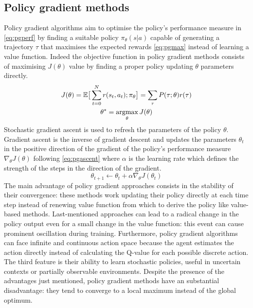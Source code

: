 \subsection{Policy gradient methods}

Policy gradient algorithms aim to optimise the policy's performance measure in \vref{eq:pgperf} by finding a suitable policy $\pi_\theta(s|a)$ capable of generating a trajectory $\tau$ that maximises the expected rewards \vref{eq:pgmax} instead of learning a  value function. Indeed the objective function in policy gradient methods consists of maximising $J(\theta)$ value by finding a proper policy updating $\theta$ parameters directly.
\begin{gather}
	J(\theta) = \mathbb{E}\big[\sum_{t=0}^{N}r(s_t,a_t); \pi_\theta\big] = \sum_{\tau}P(\tau;\theta)r(\tau) \label{eq:pgperf}\\
	\theta^* = \operatornamewithlimits{argmax}_\theta J(\theta) \label{eq:pgmax}
\end{gather}
Stochastic gradient ascent is used to refresh the parameters of the policy $\theta$. Gradient ascent is the inverse of gradient descent and updates the parameters $\theta_t$ in the positive direction of the gradient of the policy’s performance measure $\nabla_\theta J(\theta)$ following \vref{eq:pgascent} where $\alpha$ is the learning rate which defines the strength of the steps in the direction of the gradient.
\begin{equation}
	\theta_{t+1} \leftarrow \theta_t + \alpha \nabla_\theta J(\theta_t) \label{eq:pgascent}
\end{equation}
The main advantage of policy gradient approaches consists in the stability of their convergence: these methods work updating their policy directly at each time step instead of renewing value function from which to derive the policy like value-based methods. Last-mentioned approaches can lead to a radical change in the policy output even for a small change in the value function: this event can cause prominent oscillation during training.
Furthermore, policy gradient algorithms can face infinite and continuous action space because the agent estimates the action directly instead of calculating the Q-value for each possible discrete action.
The third feature is their ability to learn stochastic policies, useful in uncertain contexts or partially observable environments.
Despite the presence of the advantages just mentioned, policy gradient methods have an substantial disadvantage: they tend to converge to a local maximum instead of the global optimum.

